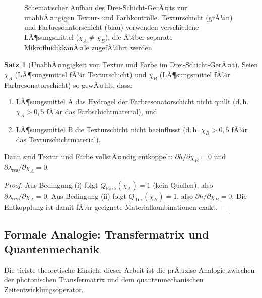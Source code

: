 ﻿\documentclass[a4paper,12pt]{article}
\theoremstyle{definition}
\newtheorem{satz}{Satz}[section]
\begin{document}
\begin{figure}[htb]
		\caption{Schematischer Aufbau des Drei-Schicht-GerÃ¤ts zur unabhÃ¤ngigen
			Textur- und Farbkontrolle. Texturschicht (grÃ¼n) und Farbresonatorschicht
			(blau) verwenden verschiedene LÃ¶sungsmittel ($\chi_A \neq \chi_B$),
			die Ã¼ber separate MikrofluidikkanÃ¤le zugefÃ¼hrt werden.}
		\label{fig:drei-schicht}
	\end{figure}
	
	\begin{satz}[UnabhÃ¤ngigkeit von Textur und Farbe im Drei-Schicht-GerÃ¤t]
		\label{satz:unabhaengigkeit}
		Seien $\chi_A$ (LÃ¶sungsmittel fÃ¼r Texturschicht) und $\chi_B$
		(LÃ¶sungsmittel fÃ¼r Farbresonatorschicht) so gewÃ¤hlt, dass:
		\begin{enumerate}[label=(\roman*)]
			\item LÃ¶sungsmittel A das Hydrogel der Farbresonatorschicht nicht quillt
			(d.\,h. $\chi_A > 0{,}5$ fÃ¼r das Farbschichtmaterial), und
			\item LÃ¶sungsmittel B die Texturschicht nicht beeinflusst
			(d.\,h. $\chi_B > 0{,}5$ fÃ¼r das Texturschichtmaterial).
		\end{enumerate}
		Dann sind Textur und Farbe vollstÃ¤ndig entkoppelt:
		$\partial h/\partial\chi_B = 0$ und $\partial\lambda_\mathrm{res}/\partial\chi_A = 0$.
	\end{satz}
	
	\begin{proof}
		Aus Bedingung (i) folgt $Q_\mathrm{Farb}(\chi_A) = 1$ (kein Quellen),
		also $\partial\lambda_\mathrm{res}/\partial\chi_A = 0$.
		Aus Bedingung (ii) folgt $Q_\mathrm{Tex}(\chi_B) = 1$,
		also $\partial h/\partial\chi_B = 0$.
		Die Entkopplung ist damit fÃ¼r geeignete Materialkombinationen exakt.
	\end{proof}
	
	\subsection{Formale Analogie: Transfermatrix und Quantenmechanik}
	\label{ssec:qm-analogie}
	
	Die tiefste theoretische Einsicht dieser Arbeit ist die prÃ¤zise Analogie
	zwischen der photonischen Transfermatrix und dem quantenmechanischen
	Zeitentwicklungsoperator.
	
\end{document}
